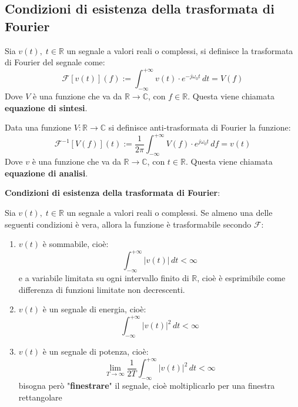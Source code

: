 \documentclass[a4paper]{article}
\begin{document}
\subsection{Condizioni di esistenza della trasformata di Fourier}
\begin{definition}
  Sia \( v(t), \; t \in \mathbb{R} \) un segnale a valori reali o complessi, si definisce
  la trasformata di Fourier del segnale come:
  \[
    \mathcal{F} \left[ v(t) \right](f) := \int_{-\infty}^{+\infty} v(t) \cdot
    e^{-j \omega_0 t} \, dt = V(f)
  \] 
  Dove \( V \) è una funzione che va da \( \mathbb{R} \to \mathbb{C} \), con \( f \in \mathbb{R} \).
  Questa viene chiamata \textbf{equazione di sintesi}.
\end{definition}
\begin{definition}
  Data una funzione \( V: \mathbb{R} \to \mathbb{C} \) si definisce anti-trasformata di
  Fourier la funzione:
  \[
    \mathcal{F}^{-1}\left[ V(f) \right](t) := \frac{1}{2 \pi } \int_{-\infty}^{+\infty} V(f) \cdot
    e^{j \omega_0 t} \, df = v(t)
  \] 
  Dove \( v \) è una funzione che va da \( \mathbb{R} \to \mathbb{C} \), con \( t \in \mathbb{R} \).
  Questa viene chiamata \textbf{equazione di analisi}.
\end{definition}
\vspace{1em}
\noindent
\textbf{Condizioni di esistenza della trasformata di Fourier}:
\begin{theorem}
  Sia \( v(t), \; t \in \mathbb{R} \) un segnale a valori reali o complessi. Se almeno
  una delle seguenti condizioni è vera, allora la funzione è trasformabile secondo
  \( \mathcal{F} \):
  \begin{enumerate}
    \item \( v(t) \) è sommabile, cioè: 
      \[
        \int_{-\infty}^{+\infty} \left| v(t) \right| \,dt < \infty
      \]
      e a variabile limitata su ogni intervallo finito di \( \mathbb{R} \), cioè è
      esprimibile come differenza di funzioni limitate non decrescenti.

    \item \( v(t) \) è un segnale di energia, cioè:
      \[
        \int_{-\infty}^{+\infty} \left| v(t) \right|^2 \, dt < \infty
      \]

    \item \( v(t) \) è un segnale di potenza, cioè:
      \[
        \lim_{T \to \infty} \frac{1}{2T} \int_{-\infty}^{+\infty} \left| v(t) \right|^2 \, dt < \infty
      \] 
      bisogna però "\textbf{finestrare}" il segnale, cioè moltiplicarlo per una
      finestra rettangolare
  \end{enumerate}
\end{theorem}
\end{document}

